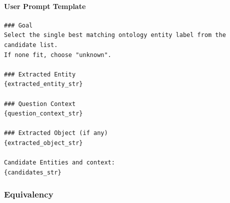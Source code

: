 \paragraph*{User Prompt Template}
\begin{verbatim}
### Goal
Select the single best matching ontology entity label from the candidate list.
If none fit, choose "unknown".

### Extracted Entity
{extracted_entity_str}

### Question Context
{question_context_str}

### Extracted Object (if any)
{extracted_object_str}

Candidate Entities and context:
{candidates_str}
\end{verbatim}

\vspace{1em}

\subsubsection*{Equivalency}

